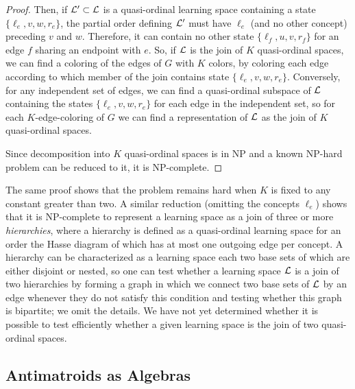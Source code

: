 \documentclass[11pt]{llncs}
\begin{document}
{\begin{proof}
Then, if ${\cal L}'\subset{\cal L}$ is a quasi-ordinal learning space containing a state $\{\ell_e,v,w,r_e\}$, the partial order defining ${\cal L'}$ must have $\ell_e$ (and no other concept) preceding $v$ and $w$.
Therefore, it can contain no other state $\{\ell_f,u,v,r_f\}$ for an edge $f$ sharing an endpoint with $e$. So, if $\cal L$ is the join of $K$ quasi-ordinal spaces, we can find a coloring of the edges of $G$ with $K$ colors, by coloring each edge according to which member of the join contains state  $\{\ell_e,v,w,r_e\}$.  Conversely, for any independent set of edges, we can find a quasi-ordinal subspace of $\cal L$ containing the states  $\{\ell_e,v,w,r_e\}$ for each edge in the independent set, so for each $K$-edge-coloring of $G$ we can find a representation of $\cal L$ as the join of $K$ quasi-ordinal spaces.

Since decomposition into $K$ quasi-ordinal spaces is in NP and a known NP-hard problem can be reduced to it, it is NP-complete.
\end{proof}

The same proof shows that the problem remains hard when $K$ is fixed to any constant greater than two. A similar reduction (omitting the concepts $\ell_e$) shows that it is NP-complete to represent a learning space as a join of three or more \emph{hierarchies}, where a hierarchy is defined as a quasi-ordinal learning space for an order the Hasse diagram of which has at most one outgoing edge per concept. A hierarchy can be characterized as a learning space each two base sets of which are either disjoint or nested, so one can test whether a learning space $\cal L$ is a join of two hierarchies by forming a graph in which we connect two base sets of $\cal L$ by an edge whenever they do not satisfy this condition and testing whether this graph is bipartite; we omit the details. We have not yet determined whether it is possible to test efficiently whether a given learning space is the join of two quasi-ordinal spaces.

\subsection{Antimatroids as Algebras}

}
\end{document}
